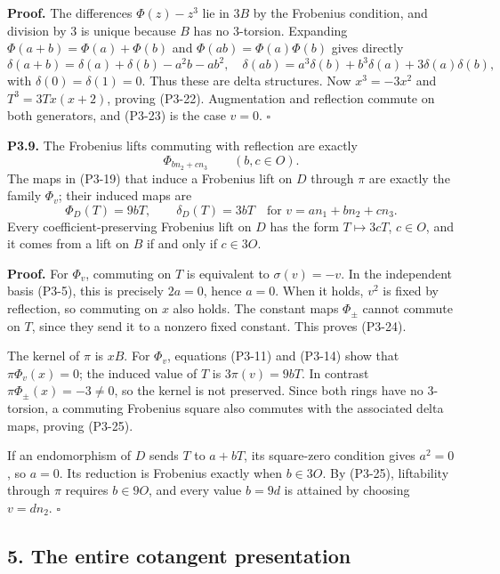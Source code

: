 \documentclass[
  10pt,
]{article}
\begin{document}
\textbf{Proof.} The differences \(\Phi(z)-z^3\) lie in \(3B\) by the
Frobenius condition, and division by 3 is unique because \(B\) has no
3-torsion. Expanding \(\Phi(a+b)=\Phi(a)+\Phi(b)\) and
\(\Phi(ab)=\Phi(a)\Phi(b)\) gives directly \[
\delta(a+b)=\delta(a)+\delta(b)-a^2b-ab^2,
\quad
\delta(ab)=a^3\delta(b)+b^3\delta(a)+3\delta(a)\delta(b),
\] with \(\delta(0)=\delta(1)=0\). Thus these are delta structures. Now
\(x^3=-3x^2\) and \(T^3=3Tx(x+2)\), proving (P3-22). Augmentation and
reflection commute on both generators, and (P3-23) is the case \(v=0\).
\(\square\)

\textbf{P3.9.} The Frobenius lifts commuting with reflection are exactly
\[
\Phi_{bn_2+cn_3}\qquad(b,c\in O).
\tag{P3-24}
\] The maps in (P3-19) that induce a Frobenius lift on \(D\) through
\(\pi\) are exactly the family \(\Phi_v\); their induced maps are \[
\Phi_D(T)=9bT,\qquad\delta_D(T)=3bT
\quad\text{for }v=an_1+bn_2+cn_3.
\tag{P3-25}
\] Every coefficient-preserving Frobenius lift on \(D\) has the form
\(T\mapsto3cT\), \(c\in O\), and it comes from a lift on \(B\) if and
only if \(c\in3O\).

\textbf{Proof.} For \(\Phi_v\), commuting on \(T\) is equivalent to
\(\sigma(v)=-v\). In the independent basis (P3-5), this is precisely
\(2a=0\), hence \(a=0\). When it holds, \(v^2\) is fixed by reflection,
so commuting on \(x\) also holds. The constant maps \(\Phi_\pm\) cannot
commute on \(T\), since they send it to a nonzero fixed constant. This
proves (P3-24).

The kernel of \(\pi\) is \(xB\). For \(\Phi_v\), equations (P3-11) and
(P3-14) show that \(\pi\Phi_v(x)=0\); the induced value of \(T\) is
\(3\pi(v)=9bT\). In contrast \(\pi\Phi_\pm(x)=-3\ne0\), so the kernel is
not preserved. Since both rings have no 3-torsion, a commuting Frobenius
square also commutes with the associated delta maps, proving (P3-25).

If an endomorphism of \(D\) sends \(T\) to \(a+bT\), its square-zero
condition gives \(a^2=0\), so \(a=0\). Its reduction is Frobenius
exactly when \(b\in3O\). By (P3-25), liftability through \(\pi\)
requires \(b\in9O\), and every value \(b=9d\) is attained by choosing
\(v=dn_2\). \(\square\)

\subsection{5. The entire cotangent
presentation}\label{the-entire-cotangent-presentation}
\end{document}
